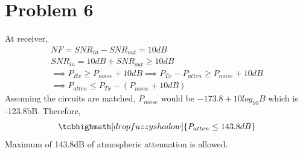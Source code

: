 \documentclass{article}
\begin{document}
\section*{\hfil Problem 6}
At receiver,
\begin{gather*}
NF = SNR_{in} - SNR_{out} = 10dB\\
SNR_{in} = 10dB + SNR_{out} \ge 10dB\\
\implies P_{Rx} \ge P_{noise} + 10dB \implies P_{Tx} - P_{atten} \ge P_{noise} + 10dB\\
\implies P_{atten} \le  P_{Tx} - (P_{noise} + 10dB)
\end{gather*}
Assuming the circuits are matched, $P_{noise}$ would be $-173.8 + 10log_{10}B$ which is -123.8bB. Therefore,
\begin{gather*}
\tcbhighmath[drop fuzzy shadow]{P_{atten} \le 143.8dB}
\end{gather*}
Maximum of 143.8dB of atmospheric attenuation is allowed.
\end{document}
